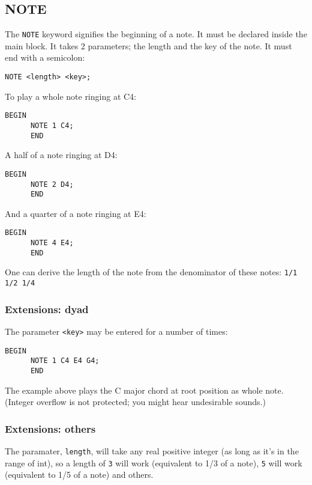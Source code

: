 \documentclass{article}
\begin{document}
\subsection{NOTE}

The \verb+NOTE+ keyword signifies the beginning of a note. It must be declared
inside the main block.
It takes 2 parameters; the length and the key of the note. It must end with
a semicolon: 
\begin{Verbatim}[frame=single]
      NOTE <length> <key>;
\end{Verbatim}

To play a whole note ringing at C4:
\begin{Verbatim}[frame=single]
      BEGIN
      NOTE 1 C4;
      END
\end{Verbatim}
\newpage
A half of a note ringing at D4:
\begin{Verbatim}[frame=single]
      BEGIN
      NOTE 2 D4;
      END
\end{Verbatim}

And a quarter of a note ringing at E4:
\begin{Verbatim}[frame=single]
      BEGIN
      NOTE 4 E4;
      END
\end{Verbatim}

One can derive the length of the note from the denominator of these notes:
\verb+1/1 1/2 1/4+

\subsubsection{Extensions: dyad}
The parameter \verb+<key>+ may be entered for a number of times:
\begin{Verbatim}[frame=single]
      BEGIN
      NOTE 1 C4 E4 G4;
      END
\end{Verbatim}

The example above plays the C major chord at root position as whole note. (Integer overflow is not
protected; you might hear undesirable sounds.)

\subsubsection{Extensions: others}
The paramater, \verb+length+, will take any real positive integer (as long as it's in the range of int),
so a length of \verb+3+ will work (equivalent to 1/3 of a note), \verb+5+ will work (equivalent to 1/5
of a note) and others. \newline
\end{document}
